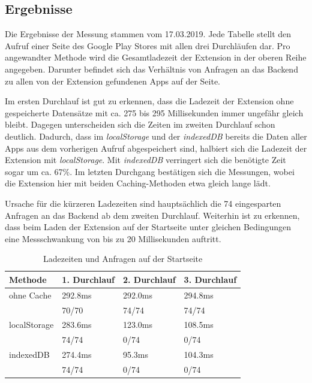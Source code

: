 \subsection{Ergebnisse}
\label{ss:ergebnisseht2}

Die Ergebnisse der Messung stammen vom 17.03.2019. Jede Tabelle stellt den Aufruf einer Seite des Google Play Stores mit allen drei Durchläufen dar. Pro angewandter Methode wird die Gesamtladezeit der Extension in der oberen Reihe angegeben. Darunter befindet sich das Verhältnis von Anfragen an das Backend zu allen von der Extension gefundenen Apps auf der Seite.

Im ersten Durchlauf ist gut zu erkennen, dass die Ladezeit der Extension ohne gespeicherte Datensätze mit ca. 275 bis 295 Millisekunden immer ungefähr gleich bleibt. Dagegen unterscheiden sich die Zeiten im zweiten Durchlauf schon deutlich. Dadurch, dass im \textit{localStorage} und der \textit{indexedDB} bereits die Daten aller Apps aus dem vorherigen Aufruf abgespeichert sind, halbiert sich die Ladezeit der Extension mit \textit{localStorage}. Mit \textit{indexedDB} verringert sich die benötigte Zeit sogar um ca. 67\%. Im letzten Durchgang bestätigen sich die Messungen, wobei die Extension hier mit beiden Caching-Methoden etwa gleich lange lädt. 

Ursache für die kürzeren Ladezeiten sind hauptsächlich die 74 eingesparten Anfragen an das Backend ab dem zweiten Durchlauf. Weiterhin ist zu erkennen, dass beim Laden der Extension auf der Startseite unter gleichen Bedingungen eine Messschwankung von bis zu 20 Millisekunden auftritt.

\begin{table}[h]
	\begin{tabular}{p{2.8cm}C{3.0cm}C{2.8cm}C{3.0cm}}
		\toprule
		\textbf{Methode}	&	\textbf{1. Durchlauf}	&	\textbf{2. Durchlauf}	& \textbf{3. Durchlauf}\\
			\midrule
			ohne Cache	&	292.8ms	&	292.0ms	&	294.8ms	\\
						&	70/70	&	74/74	&	74/74	\\

			localStorage	&	283.6ms	&	123.0ms	&	108.5ms	\\
						&	74/74	&	0/74	&	0/74	\\

			indexedDB	&	274.4ms	&	95.3ms	&	104.3ms	\\
						&	74/74	&	0/74	&	0/74	\\

			\bottomrule
		\end{tabular}
		\caption{Ladezeiten und Anfragen auf der Startseite}
		\label{ergebnis11}
\end{table}

